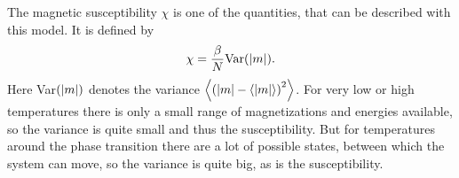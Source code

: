 The magnetic susceptibility $\chi$ is one of the quantities, that can be described with this model. It is defined by
\begin{equation}
 \chi = \frac{\beta}{N} \text{Var}(\left\vert m \right\vert).
\end{equation}
Here Var$(\left\vert m \right\vert)$ denotes the variance $\left\langle{(\left\vert m \right\vert - \left\langle\left\vert m \right\vert\right\rangle)} ^2\right\rangle$. For very low or high temperatures there is only a small range of magnetizations and energies available, so the variance is quite small and thus the susceptibility. But for temperatures around the phase transition there are a lot of possible states, between which the system can move, so the variance is quite big, as is the susceptibility.
